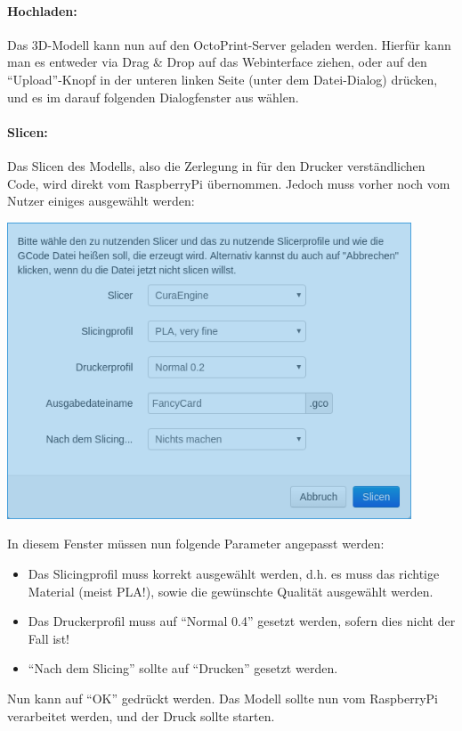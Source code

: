 \paragraph{Hochladen:} Das 3D-Modell kann nun auf den OctoPrint-Server geladen werden. Hierfür kann man es entweder via Drag \& Drop auf das Webinterface ziehen, oder auf den "`Upload"'-Knopf in der unteren linken Seite (unter dem Datei-Dialog) drücken, und es im darauf folgenden Dialogfenster aus wählen.

\paragraph{Slicen:} Das Slicen des Modells, also die Zerlegung in für den Drucker verständlichen Code, wird direkt vom RaspberryPi übernommen. Jedoch muss vorher noch vom Nutzer einiges ausgewählt werden:\\
\begin{center}
\includegraphics[width=0.9\textwidth]{Bilder/OPSliceWindow.png}
\end{center}
In diesem Fenster müssen nun folgende Parameter angepasst werden:
\begin{itemize}[noitemsep]
\item Das Slicingprofil muss korrekt ausgewählt werden, d.h. es muss das richtige Material (meist PLA!), sowie die gewünschte Qualität ausgewählt werden.
\item Das Druckerprofil muss auf "`Normal 0.4"' gesetzt werden, sofern dies nicht der Fall ist!
\item "`Nach dem Slicing"' sollte auf "`Drucken"' gesetzt werden.
\end{itemize}
Nun kann auf "`OK"' gedrückt werden. Das Modell sollte nun vom RaspberryPi verarbeitet werden, und der Druck sollte starten.


